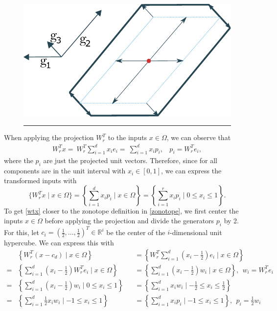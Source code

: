 \documentclass[
  a4paper,  %
  twoside,  %
  bibliography=totoc,
  headsepline,
  cleardoublepage=empty,
  parskip=half,
  draft=false
]{scrbook}
\newcommand{\delimit}{{\color{charcoal}\noindent\rule{\textwidth}{1pt}}}
\begin{document}
\begin{mdframed}[style=style]
\begin{figure}[H]
\centering
  \includegraphics[width=0.5\linewidth]{graphics/zonotope}
  \delimit
  \label{fig:zonotope}
\end{figure}
\end{mdframed}


When applying the projection $W_r^T$ to the inputs $x \in \Omega$, we can observe that
\begin{equation}
\begin{split}
W_r^T x=~W_r^T \sum_{i=1}^d x_i e_i=~\sum_{i=1}^d x_i p_i , ~~~~ p_i=W_r^T e_i,
\nonumber
\end{split}
\end{equation}
where the $p_i$ are just the projected unit vectors.
Therefore, since for all components are in the unit interval with $x_i \in [0,1]$, we can express the transformed inputs with
\begin{equation}
\{W_r^T x \mid x \in \Omega\}=\left\{\sum_{i=1}^d x_i p_i \mid x \in \Omega \right\}=\left\{ \sum_{i=1}^r x_i p_i \mid 0 \leq x_i \leq 1\right\}.
\label{wtx}
\end{equation}
To get \cref{wtx} closer to the zonotope definition in \cref{zonotope}, we first center the inputs $x \in \Omega$ before applying the projection and divide the generators $p_i$ by 2.
For this, let $c_i=(\frac{1}{2}, \dots, \frac{1}{2})^T\in \mathbb{R}^i$ be the center of the $i$-dimensional unit hypercube.
We can express this with
\begin{equation}
\begin{alignedat}{2}
&\left\{W_r^T (x - c_d) \mid x \in \Omega\right\}&&=\left\{W_r^T \sum_{i=1}^d \left(x_i - \frac{1}{2}\right) e_i \mid x \in \Omega \right\}\\
=&\left\{\sum_{i=1}^d \left(x_i - \frac{1}{2}\right) W_r^T e_i \mid x \in \Omega \right\}&&=\left\{\sum_{i=1}^d \left(x_i - \frac{1}{2}\right) w_i \mid x \in \Omega \right\}, ~~ w_i=W_r^T e_i\\
=&\left\{\sum_{i=1}^d \left(x_i - \frac{1}{2}\right) w_i \mid 0 \leq x_i \leq 1 \right\}&&=\left\{\sum_{i=1}^d x_i w_i \mid -\frac{1}{2} \leq x_i \leq \frac{1}{2} \right\}\\
=&\left\{\sum_{i=1}^d \frac{1}{2} x_i w_i \mid -1 \leq x_i \leq 1 \right\}&&=\left\{\sum_{i=1}^d x_i p_i \mid -1 \leq x_i \leq 1 \right\}, ~~ p_i=\frac{1}{2} w_i
\label{zonotope_form}
\end{alignedat}
\end{equation}
\end{document}
